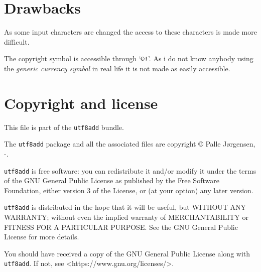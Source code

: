 \documentclass[a4paper,british,parskip=half,11pt,fleqn]{scrartcl}
\begin{document}
\section{Drawbacks}
\label{sec:drawbacks}

As some input characters are changed the access to these characters is
made more difficult.

The copyright symbol is accessible through `\verb|©!|'. As i do not
know anybody using the \emph{generic currency symbol} in real life it
is not made as easily accessible.

\section{Copyright and license}
\label{sec:copyright-license}

This file \texttt{\jobname} is part of the \texttt{utf8add} bundle.

The \texttt{utf8add} package and all the associated files are
copyright © Palle Jørgensen, \ifnum{}-\the\year\fi.

\texttt{utf8add} is free software: you can redistribute it and/or
modify it under the terms of the GNU General Public License as
published by the Free Software Foundation, either version 3 of the
License, or (at your option) any later version.

\texttt{utf8add} is distributed in the hope that it will be useful,
but WITHOUT ANY WARRANTY; without even the implied warranty of
MERCHANTABILITY or FITNESS FOR A PARTICULAR PURPOSE. See the GNU
General Public License for more details.

You should have received a copy of the GNU General Public License
along with \texttt{utf8add}. If not, see
<https://www.gnu.org/licenses/>.
\end{document}
